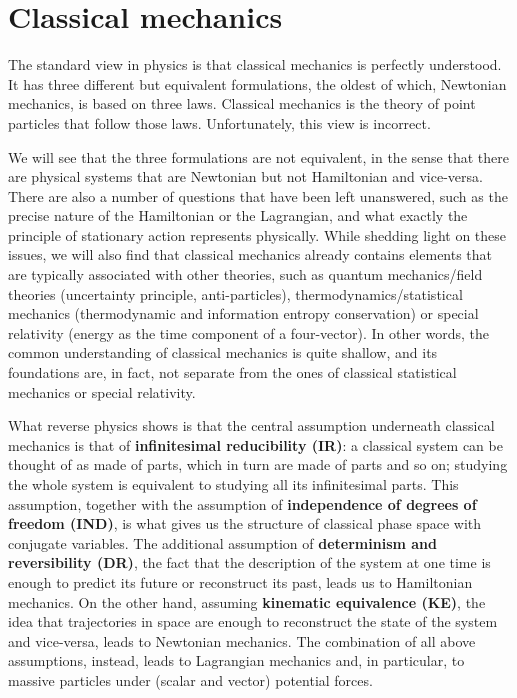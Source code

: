 \chapter{Classical mechanics}

The standard view in physics is that classical mechanics is perfectly understood. It has three different but equivalent formulations, the oldest of which, Newtonian mechanics, is based on three laws. Classical mechanics is the theory of point particles that follow those laws. Unfortunately, this view is incorrect.

We will see that the three formulations are not equivalent, in the sense that there are physical systems that are Newtonian but not Hamiltonian and vice-versa. There are also a number of questions that have been left unanswered, such as the precise nature of the Hamiltonian or the Lagrangian, and what exactly the principle of stationary action represents physically. While shedding light on these issues, we will also find that classical mechanics already contains elements that are typically associated with other theories, such as quantum mechanics/field theories (uncertainty principle, anti-particles), thermodynamics/statistical mechanics (thermodynamic and information entropy conservation) or special relativity (energy as the time component of a four-vector). In other words, the common understanding of classical mechanics is quite shallow, and its foundations are, in fact, not separate from the ones of classical statistical mechanics or special relativity.

What reverse physics shows is that the central assumption underneath classical mechanics is that of \textbf{infinitesimal reducibility (IR)}: a classical system can be thought of as made of parts, which in turn are made of parts and so on; studying the whole system is equivalent to studying all its infinitesimal parts. This assumption, together with the assumption of \textbf{independence of degrees of freedom (IND)}, is what gives us the structure of classical phase space with conjugate variables. The additional assumption of \textbf{determinism and reversibility (DR)}, the fact that the description of the system at one time is enough to predict its future or reconstruct its past, leads us to Hamiltonian mechanics. On the other hand, assuming \textbf{kinematic equivalence (KE)}, the idea that trajectories in space are enough to reconstruct the state of the system and vice-versa, leads to Newtonian mechanics. The combination of all above assumptions, instead, leads to Lagrangian mechanics and, in particular, to massive particles under (scalar and vector) potential forces.

